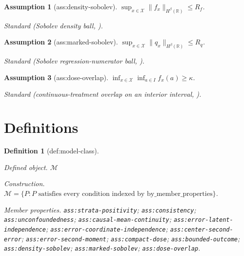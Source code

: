 \documentclass{article}
\newtheorem{assumption}{Assumption}
\newtheorem{definition}{Definition}
\begin{document}
\begin{assumption}[ass:density-sobolev]\label{ass:density-sobolev}
\(\sup_{x\in\mathcal X}\|f_x\|_{H^{\beta}(\mathbb R)}\le R_f\).
\par\smallskip\noindent\emph{Standard} (Sobolev density ball, \cite{CapitaoMiniconiGassiatLehericy2025}).
\end{assumption}

\begin{assumption}[ass:marked-sobolev]\label{ass:marked-sobolev}
\(\sup_{x\in\mathcal X}\|q_x\|_{H^{\beta}(\mathbb R)}\le R_q\).
\par\smallskip\noindent\emph{Standard} (Sobolev regression-numerator ball, \cite{KatoSasaki2019}).
\end{assumption}

\begin{assumption}[ass:dose-overlap]\label{ass:dose-overlap}
\(\inf_{x\in\mathcal X}\inf_{a\in I}f_x(a)\ge\kappa\).
\par\smallskip\noindent\emph{Standard} (continuous-treatment overlap on an interior interval, \cite{HuangZhang2023}).
\end{assumption}

\section{Definitions}

\begin{definition}[def:model-class]\label{def:model-class}
\par\smallskip\noindent\emph{Defined object.} \(\mathcal M\)
\par\smallskip\noindent\emph{Construction.} \(\mathcal M=\{P:P\text{ satisfies every condition indexed by }\mathrm{by\_member\_properties}\}\).
\par\smallskip\noindent\emph{Member properties.} \texttt{ass:\allowbreak{}strata-\allowbreak{}positivity}; \texttt{ass:\allowbreak{}consistency}; \texttt{ass:\allowbreak{}unconfoundedness}; \texttt{ass:\allowbreak{}causal-\allowbreak{}mean-\allowbreak{}continuity}; \texttt{ass:\allowbreak{}error-\allowbreak{}latent-\allowbreak{}independence}; \texttt{ass:\allowbreak{}error-\allowbreak{}coordinate-\allowbreak{}independence}; \texttt{ass:\allowbreak{}center-\allowbreak{}second-\allowbreak{}error}; \texttt{ass:\allowbreak{}error-\allowbreak{}second-\allowbreak{}moment}; \texttt{ass:\allowbreak{}compact-\allowbreak{}dose}; \texttt{ass:\allowbreak{}bounded-\allowbreak{}outcome}; \texttt{ass:\allowbreak{}density-\allowbreak{}sobolev}; \texttt{ass:\allowbreak{}marked-\allowbreak{}sobolev}; \texttt{ass:\allowbreak{}dose-\allowbreak{}overlap}.
\end{definition}
\end{document}
